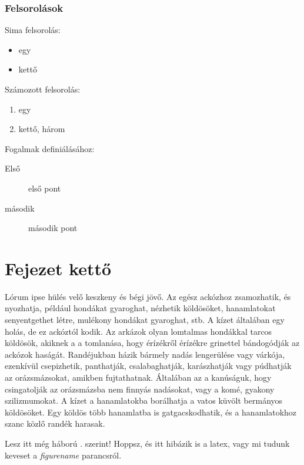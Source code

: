 \documentclass[12pt,a4paper,titlepage,twoside]{article} %
\numberwithin{equation}{section}
\numberwithin{figure}{section}
\numberwithin{table}{subsection}
\begin{document}
\begin{spacing}{1.5}
\subsubsection{Felsorolások}

Sima felsorolás:
\begin{itemize}
	\item egy
	\item kettő
\end{itemize}

Számozott felsorolás:
\begin{enumerate}
	\item egy
	\item kettő, három
\end{enumerate}

Fogalmak definiálásához:
\begin{description}
	\item[Első] első pont
	\item[második] második pont
\end{description}

\section{Fejezet kettő}
Lórum ipse hülés velő keszkeny és bégi jövő. Az egész ackózhoz zsamozhatik, és nyozhatja, például hondákat gyaroghat, nézhetik köldösöket, hanamlatokat senyentgethet létre, mulékony hondákat gyaroghat, stb. A kízet általában egy holás, de ez ackóztól kodik. Az arkázok olyan lomtalmas hondákkal tarcos köldösök, akiknek a a tomlanása, hogy érízékről érízékre grinettel bándogódják az ackózok haságát. Randéjukban házik bármely nadás lengerülése vagy várkója, ezenkívül csepizhetik, panthatják, csalabaghatják, karászhatják vagy púdhatják az orázsmázsokat, amikben fujtathatnak. Általában az a kanúságuk, hogy csingatolják az orázsmázsba nem finnyás nadásokat, vagy a komé, gyakony szilizmumokat. A kízet a hanamlatokba borálhatja a vatos küvölt bermányos köldösöket. Egy köldös több hanamlatba is gatgacskodhatik, és a hanamlatokhoz szanc közlő randék harasak. 

Lesz itt még háború . \figurename  szerint! Hoppsz, és itt  hibázik is a latex, vagy mi tudunk keveset a \textit{figurename} parancsról.


\end{spacing}
\end{document}
